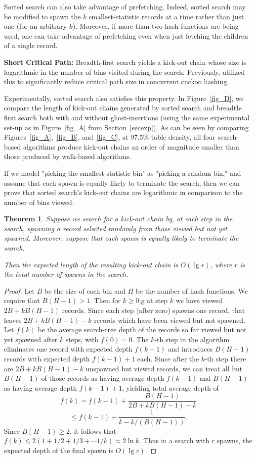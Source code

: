 \documentclass{sig-alternate-05-2015}
\newtheorem{thm}{Theorem}[section]
\begin{document}
Sorted search can also take advantage of prefetching. Indeed, sorted
search may be modified to spawn the $k$ smallest-statistic records at
a time rather than just one (for an arbitrary $k$). Moreover, if more
than two hash functions are being used, one can take advantage of
prefetching even when just fetching the children of a single record.

\textbf{Short Critical Path:} Breadth-first search yields a kick-out
chain whose size is logarithmic in the number of bins visited
during the search. Previously, \cite{li14} utilized this to
significantly reduce critical path size in concurrent cuckoo hashing.

Experimentally, sorted search also satisfies this property. In
Figure~\ref{fig_D}, we compare the length of kick-out chains generated
by sorted search and breadth-first search both with and without
ghost-insertions (using the same experimental set-up as in
Figure~\ref{fig_A} from Section~\ref{secexp}). As can be seen by
comparing Figures~\ref{fig_A},~\ref{fig_B}, and~\ref{fig_C}, at 97.5\%
table density, all four search-based algorithms produce kick-out
chains an order of magnitude smaller than those produced by walk-based
algorithms.


If we model "picking the smallest-statistic bin" as "picking a random
bin," and assume that each spawn is equally likely to terminate the
search, then we can prove that sorted search's kick-out chains are
logarithmic in comparison to the number of bins viewed.

\begin{thm}
Suppose we search for a kick-out chain by, at each step in the search,
spawning a record selected randomly from those viewed but not yet
spawned. Moreover, suppose that each spawn is equally likely to
terminate the search.
  
Then the expected length of the resulting kick-out chain is $O(\lg
r)$, where $r$ is the total number of spawns in the search.
\end{thm}
\begin{proof}
Let $B$ be the size of each bin and $H$ be the number of hash
functions. We require that $B(H-1) > 1$. Then for $k \ge 0$,g at step
$k$ we have viewed $2B + kB(H-1)$ records. Since each step (after
zero) spawns one record, that leaves $2B + kB(H-1)-k$ records which
have been viewed but not spawned. Let $f(k)$ be the average
search-tree depth of the records so far viewed but not yet spawned
after $k$ steps, with $f(0) = 0$. The $k$-th step in the algorithm
eliminates one record with expected depth $f(k-1)$ and introduces
$B(H-1)$ records with expected depth $f(k-1)+1$ each. Since after the
$k$-th step there are $2B + kB(H-1)-k$ unspawned but viewed records,
we can treat all but $B(H-1)$ of those records as having average depth
$f(k-1)$ and $B(H-1)$ as having average depth $f(k-1)+1$, yielding
total average depth of $$f(k) = f(k-1) + \dfrac{B(H-1)}{2B + kB(H-1) -
  k}$$ $$\le f(k-1) + \dfrac{1}{k - k/(B(H - 1))}.$$ Since $B(H-1)
\geq 2$, it follows that $f(k) \leq 2 (1+1/2+1/3+\cdots 1/k) \approx
2\ln k$. Thus in a search with $r$ spawns, the expected depth of the
final spawn is $O(\lg r)$.
\end{proof}
\end{document}
